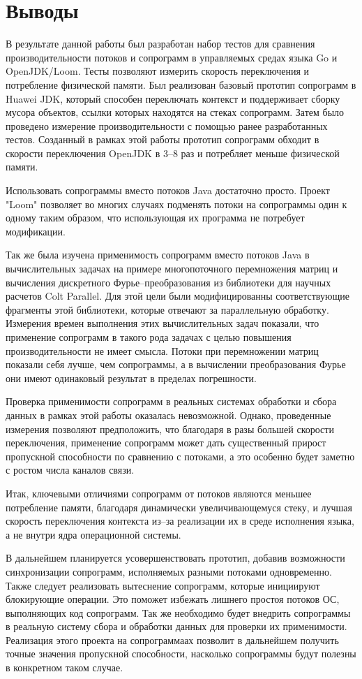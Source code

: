 \section{Выводы}
	В результате данной работы был разработан набор тестов для сравнения производительности потоков и сопрограмм в
	управляемых средах языка Go и OpenJDK/Loom. Тесты позволяют измерить скорость переключения и
	потребление физической памяти. Был реализован базовый прототип сопрограмм в
	Huawei JDK, который способен переключать контекст и поддерживает сборку мусора объектов, ссылки которых находятся
	на стеках сопрограмм. Затем было проведено измерение производительности с помощью ранее разработанных тестов.
	Созданный в рамках этой работы прототип сопрограмм обходит в скорости переключения
	OpenJDK в 3--8 раз и потребляет меньше физической памяти.
	\par
	Использовать сопрограммы вместо потоков Java достаточно просто. Проект "Loom"
	позволяет во многих случаях подменять потоки на сопрограммы один к одному таким образом,
	что использующая их программа не потребует модификации.
	\par
	Так же была изучена применимость сопрограмм вместо потоков Java в вычислительных задачах на
	примере многопоточного перемножения матриц и вычисления дискретного Фурье--преобразования 
	из библиотеки для научных расчетов Colt Parallel. Для этой цели были модифицированны соответствующие 
	фрагменты этой библиотеки, которые отвечают за параллельную обработку.
	Измерения времен выполнения этих вычислительных задач показали, что применение сопрограмм в 
	такого рода задачах с целью повышения производительности не имеет смысла. Потоки при 
	перемножении матриц показали себя лучше,
	чем сопрограммы, а в вычислении преобразования Фурье они имеют одинаковый результат в пределах погрешности.
	\par
	Проверка применимости сопрограмм в реальных системах обработки и сбора данных в рамках
	этой работы оказалась невозможной. Однако, проведенные измерения позволяют предположить,
	что благодаря в разы большей скорости переключения, применение сопрограмм может дать 
	существенный прирост пропускной способности по сравнению с потоками, а это особенно будет заметно
	с ростом числа каналов связи. 
	\par
	Итак, ключевыми отличиями сопрограмм от потоков являются меньшее потребление памяти, благодаря
	динамически увеличивающемуся стеку, и лучшая скорость переключения контекста из--за реализации 
	их в среде исполнения языка, а не внутри ядра операционной системы.
	\par
	В дальнейшем планируется усовершенствовать прототип, добавив возможности синхронизации
	сопрограмм, исполняемых разными потоками одновременно. Также следует реализовать вытеснение сопрограмм, которые
	инициируют блокирующие операции. Это поможет избежать лишнего простоя потоков ОС, выполняющих код сопрограмм. 
	Так же необходимо будет внедрить сопрограммы в реальную систему сбора и обработки данных для проверки их 
	применимости. Реализация этого проекта на сопрограммаах позволит в дальнейшем получить точные значения
	пропускной способности, насколько сопрограммы будут полезны в конкретном таком случае.  
\clearpage
